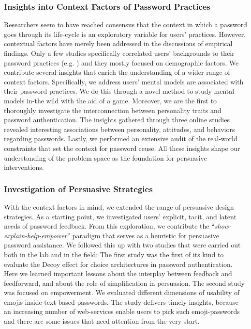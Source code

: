 \subsubsection{Insights into Context Factors of Password Practices}
Researchers seem to have reached consensus that the context in which a password goes through its life-cycle \cite{Stobert2014PasswordLifeCycle} is an exploratory variable for users' practices. However, contextual factors have merely been addressed in the discussions of empirical findings. Only a few studies specifically correlated users' backgrounds to their password practices (e.g. \cite{Kessem2018IBMFutureIdentity, Mazurek2013Measuring}) and they mostly focused on demographic factors. We contribute several insights that enrich the understanding of a wider range of context factors. Specifically, we address users' mental models are associated with their password practices. We do this through a novel method to study mental models in-the wild with the aid of a game. Moreover, we are the first to thoroughly investigate the interconnection between personality traits and password authentication. The insights gathered through three online studies revealed interesting associations between personality, attitudes, and behaviors regarding passwords. Lastly, we performed an extensive audit of the real-world constraints that set the context for password reuse. All these insights shape our understanding of the problem space as the foundation for persuasive interventions. 

\subsubsection{Investigation of Persuasive Strategies}
With the context factors in mind, we extended the range of persuasive design strategies. As a starting point, we investigated users' explicit, tacit, and latent needs of password feedback. From this exploration, we contribute the ``\textit{show-explain-help-empower}'' paradigm that serves as a heuristic for persuasive password assistance. We followed this up with two studies that were carried out both in the lab and in the field: The first study was the first of its kind to evaluate the Decoy effect for choice architectures in password authentication. Here we learned important lessons about the interplay between feedback and feedforward, and about the role of simplification in persuasion. The second study was focused on empowerment. We evaluated different dimensions of usability of emojis inside text-based passwords. The study delivers timely insights, because an increasing number of web-services enable users to pick such emoji-passwords and there are some issues that need attention from the very start. 

